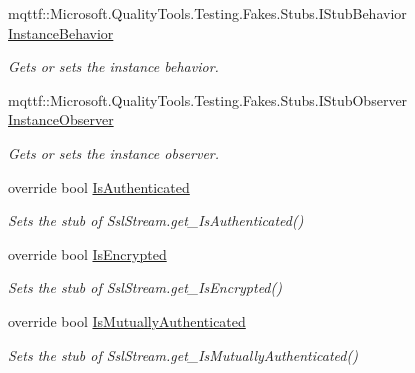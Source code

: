 \begin{DoxyCompactItemize}
mqttf\-::\-Microsoft.\-Quality\-Tools.\-Testing.\-Fakes.\-Stubs.\-I\-Stub\-Behavior \hyperlink{class_system_1_1_net_1_1_security_1_1_fakes_1_1_stub_ssl_stream_a38ff36e7f6c5ebb3e3d73a6a0d2da070}{Instance\-Behavior}
\begin{DoxyCompactList}\small\item\em Gets or sets the instance behavior.\end{DoxyCompactList}\item 
mqttf\-::\-Microsoft.\-Quality\-Tools.\-Testing.\-Fakes.\-Stubs.\-I\-Stub\-Observer \hyperlink{class_system_1_1_net_1_1_security_1_1_fakes_1_1_stub_ssl_stream_ac8612e9408aa568e391f7c40c793b7e4}{Instance\-Observer}
\begin{DoxyCompactList}\small\item\em Gets or sets the instance observer.\end{DoxyCompactList}\item 
override bool \hyperlink{class_system_1_1_net_1_1_security_1_1_fakes_1_1_stub_ssl_stream_a8a8b3e8494a0f5b230e7336109fc92df}{Is\-Authenticated}
\begin{DoxyCompactList}\small\item\em Sets the stub of Ssl\-Stream.\-get\-\_\-\-Is\-Authenticated()\end{DoxyCompactList}\item 
override bool \hyperlink{class_system_1_1_net_1_1_security_1_1_fakes_1_1_stub_ssl_stream_a78a86a3c22dda64f900cf7df39693dfc}{Is\-Encrypted}
\begin{DoxyCompactList}\small\item\em Sets the stub of Ssl\-Stream.\-get\-\_\-\-Is\-Encrypted()\end{DoxyCompactList}\item 
override bool \hyperlink{class_system_1_1_net_1_1_security_1_1_fakes_1_1_stub_ssl_stream_aac128363ce77eae1e7b09110c9f60d4d}{Is\-Mutually\-Authenticated}
\begin{DoxyCompactList}\small\item\em Sets the stub of Ssl\-Stream.\-get\-\_\-\-Is\-Mutually\-Authenticated()\end{DoxyCompactList}\item 

\end{DoxyCompactItemize}
